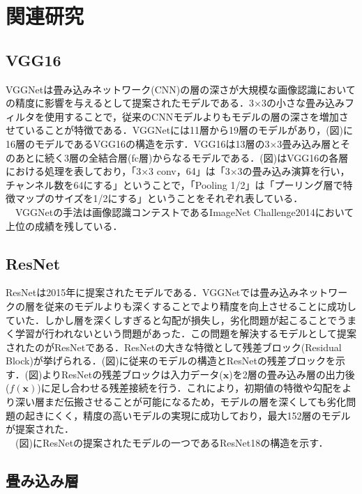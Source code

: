 


\chapter{関連研究}
\label{chap:sample}

\section{VGG16}
VGGNet\cite{VGG16}は畳み込みネットワーク(CNN)の層の深さが大規模な画像認識においての精度に影響を与えるとして提案されたモデルである．3×3の小さな畳み込みフィルタを使用することで，従来のCNNモデルよりもモデルの層の深さを増加させていることが特徴である．VGGNetには11層から19層のモデルがあり，(図)に16層のモデルであるVGG16の構造を示す．VGG16は13層の3×3畳み込み層とそのあとに続く3層の全結合層(fc層)からなるモデルである．(図)はVGG16の各層における処理を表しており，「3×3 conv，64」は「3×3の畳み込み演算を行い，チャンネル数を64にする」ということで，「Pooling 1/2」は「プーリング層で特徴マップのサイズを1/2にする」ということをそれぞれ表している．\\
　VGGNetの手法は画像認識コンテストであるImageNet Challenge2014において上位の成績を残している．
\section{ResNet}
ResNet\cite{ResNet}は2015年に提案されたモデルである．VGGNetでは畳み込みネットワークの層を従来のモデルよりも深くすることでより精度を向上させることに成功していた．しかし層を深くしすぎると勾配が損失し，劣化問題が起こることでうまく学習が行われないという問題があった．この問題を解決するモデルとして提案されたのがResNetである．ResNetの大きな特徴として残差ブロック(Residual Block)が挙げられる．(図)に従来のモデルの構造とResNetの残差ブロックを示す．(図)よりResNetの残差ブロックは入力データ($\bm{x}$)を2層の畳み込み層の出力後($f(\bm{x})$)に足し合わせる残差接続を行う．これにより，初期値の特徴や勾配をより深い層まだ伝搬させることが可能になるため，モデルの層を深くしても劣化問題の起きにくく，精度の高いモデルの実現に成功しており，最大152層のモデルが提案された．\\
　(図)にResNetの提案されたモデルの一つであるResNet18の構造を示す．

\section{畳み込み層}
